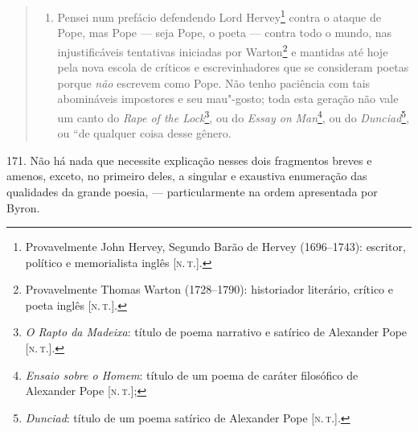 \begin{quote}
\begin{enumerate}[label=(\arabic*)]
\item\mbox{} Pensei num prefácio defendendo Lord Hervey\footnote{Provavelmente
  John Hervey, Segundo Barão de Hervey (1696--1743): escritor, político e
  memorialista inglês {[}\textsc{n.\,t.}{]}.} contra o ataque de Pope, mas Pope
--- seja Pope, o poeta --- contra todo o mundo, nas injustificáveis
tentativas iniciadas por Warton\footnote{Provavelmente Thomas Warton
  (1728--1790): historiador literário, crítico e poeta inglês {[}\textsc{n.\,t.}{]}.} e mantidas até hoje pela nova escola de críticos e
escrevinhadores que se consideram poetas porque \emph{não} escrevem como
Pope. Não tenho paciência com tais abomináveis impostores e seu
mau"-gosto; toda esta geração não vale um canto do \emph{Rape of the
Lock}\footnote{\emph{O Rapto da Madeixa}: título de poema narrativo e
  satírico de Alexander Pope {[}\textsc{n.\,t.}{]}.}, ou do \emph{Essay on}
\emph{Man}\footnote{\emph{Ensaio sobre o Homem}: título de um poema de
  caráter filosófico de Alexander Pope {[}\textsc{n.\,t.}{]};}, ou do
\emph{Dunciad}\footnote{\emph{Dunciad}: título de um poema satírico de
  Alexander Pope {[}\textsc{n.\,t.}{]}.}, ou ``de qualquer coisa desse
gênero.
\end{enumerate}
\end{quote}

171. Não há nada que necessite explicação nesses dois fragmentos breves
e amenos, exceto, no primeiro deles, a singular e exaustiva enumeração
das qualidades da grande poesia, --- particularmente na ordem apresentada
por Byron.

